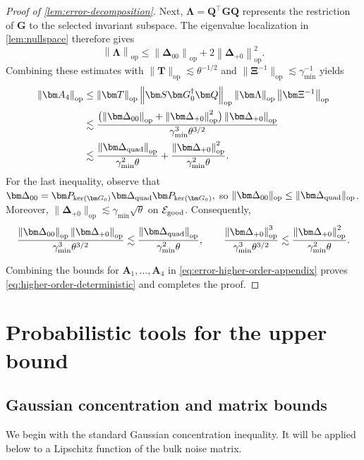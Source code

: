 \documentclass[11pt]{article}
\newcommand{\trans}{\top}
\newcommand{\opn}[1]{\left\lVert #1\right\rVert_{\mathrm{op}}}
\newcommand{\cE}{\mathcal{E}}
\newcommand{\gmin}{\gamma_{\min}}
\begin{document}
\begin{proof}[Proof of \cref{lem:error-decomposition}]
Next, $\bm\Lambda=\bm Q^\trans\bm G\bm Q$ represents the restriction of
$\bm G$ to the selected invariant subspace. The eigenvalue localization in
\cref{lem:nullspace} therefore gives
\[
  \opn{\bm\Lambda}
  \le
  \opn{\bm\Delta_{00}}
  +
  2\opn{\bm\Delta_{+0}}^2.
\]
Combining these estimates with
$\|\bm T\|_{\mathrm{op}}\lesssim\theta^{-1/2}$ and
$\|\bm\Xi^{-1}\|_{\mathrm{op}}\lesssim\gmin^{-1}$ yields
\begin{align*}
  \opn{\bm A_4}
  &\le
  \opn{\bm T}
  \opn{\bm S\bm G_0^\dagger\bm Q}
  \opn{\bm\Lambda}
  \opn{\bm\Xi^{-1}} \\
  &\lesssim
  \frac{
    \bigl(
      \opn{\bm\Delta_{00}}
      +
      \opn{\bm\Delta_{+0}}^2
    \bigr)
    \opn{\bm\Delta_{+0}}
  }{
    \gmin^3\theta^{3/2}
  } \\
  &\lesssim
  \frac{\opn{\bm\Delta_{\rm quad}}}
       {\gmin^2\theta}
  +
  \frac{\opn{\bm\Delta_{+0}}^2}
       {\gmin^2\theta}.
\end{align*}
For the last inequality, observe that $\bm\Delta_{00}
  =
  \bm P_{\ker(\bm G_0)}
  \bm\Delta_{\rm quad}
  \bm P_{\ker(\bm G_0)},$
so
$\|\bm\Delta_{00}\|_{\mathrm{op}}
\le\|\bm\Delta_{\rm quad}\|_{\mathrm{op}}$. Moreover,
$\|\bm\Delta_{+0}\|_{\mathrm{op}}
\lesssim\gmin\sqrt\theta$ on $\cE_{\rm good}$. Consequently,
\[
  \frac{
    \opn{\bm\Delta_{00}}
    \opn{\bm\Delta_{+0}}
  }{
    \gmin^3\theta^{3/2}
  }
  \lesssim
  \frac{\opn{\bm\Delta_{\rm quad}}}
       {\gmin^2\theta},
  \qquad
  \frac{\opn{\bm\Delta_{+0}}^3}
       {\gmin^3\theta^{3/2}}
  \lesssim
  \frac{\opn{\bm\Delta_{+0}}^2}
       {\gmin^2\theta}.
\]

Combining the bounds for $\bm A_1,\ldots,\bm A_4$ in
\cref{eq:error-higher-order-appendix} proves
\cref{eq:higher-order-deterministic} and completes the proof.
\end{proof}

\section{Probabilistic tools for the upper bound}
\label{sec:Gaussian}



\subsection{Gaussian concentration and matrix bounds}

We begin with the standard Gaussian concentration inequality. It will be
applied below to a Lipschitz function of the bulk noise matrix.
\end{document}
